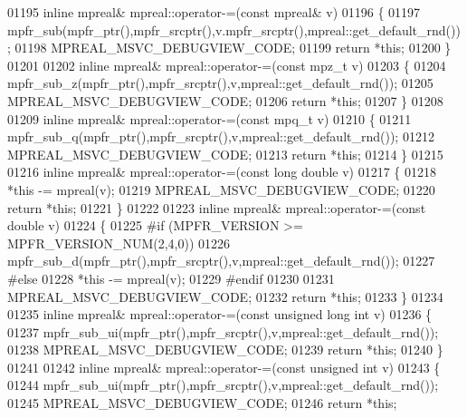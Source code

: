 \begin{DoxyCode}
01195 \textcolor{keyword}{inline} mpreal& mpreal::operator-=(\textcolor{keyword}{const} mpreal& v)
01196 \{
01197     mpfr\_sub(mpfr\_ptr(),mpfr\_srcptr(),v.mpfr\_srcptr(),mpreal::get\_default\_rnd());
01198     MPREAL\_MSVC\_DEBUGVIEW\_CODE;
01199     \textcolor{keywordflow}{return} *\textcolor{keyword}{this};
01200 \}
01201 
01202 \textcolor{keyword}{inline} mpreal& mpreal::operator-=(\textcolor{keyword}{const} mpz\_t v)
01203 \{
01204     mpfr\_sub\_z(mpfr\_ptr(),mpfr\_srcptr(),v,mpreal::get\_default\_rnd());
01205     MPREAL\_MSVC\_DEBUGVIEW\_CODE;
01206     \textcolor{keywordflow}{return} *\textcolor{keyword}{this};
01207 \}
01208 
01209 \textcolor{keyword}{inline} mpreal& mpreal::operator-=(\textcolor{keyword}{const} mpq\_t v)
01210 \{
01211     mpfr\_sub\_q(mpfr\_ptr(),mpfr\_srcptr(),v,mpreal::get\_default\_rnd());
01212     MPREAL\_MSVC\_DEBUGVIEW\_CODE;
01213     \textcolor{keywordflow}{return} *\textcolor{keyword}{this};
01214 \}
01215 
01216 \textcolor{keyword}{inline} mpreal& mpreal::operator-=(\textcolor{keyword}{const} \textcolor{keywordtype}{long} \textcolor{keywordtype}{double} v)
01217 \{
01218     *\textcolor{keyword}{this} -= mpreal(v);
01219     MPREAL\_MSVC\_DEBUGVIEW\_CODE;
01220     \textcolor{keywordflow}{return} *\textcolor{keyword}{this};
01221 \}
01222 
01223 \textcolor{keyword}{inline} mpreal& mpreal::operator-=(\textcolor{keyword}{const} \textcolor{keywordtype}{double} v)
01224 \{
01225 \textcolor{preprocessor}{#if (MPFR\_VERSION >= MPFR\_VERSION\_NUM(2,4,0))}
01226     mpfr\_sub\_d(mpfr\_ptr(),mpfr\_srcptr(),v,mpreal::get\_default\_rnd());
01227 \textcolor{preprocessor}{#else}
01228     *\textcolor{keyword}{this} -= mpreal(v);
01229 \textcolor{preprocessor}{#endif}
01230 
01231     MPREAL\_MSVC\_DEBUGVIEW\_CODE;
01232     \textcolor{keywordflow}{return} *\textcolor{keyword}{this};
01233 \}
01234 
01235 \textcolor{keyword}{inline} mpreal& mpreal::operator-=(\textcolor{keyword}{const} \textcolor{keywordtype}{unsigned} \textcolor{keywordtype}{long} \textcolor{keywordtype}{int} v)
01236 \{
01237     mpfr\_sub\_ui(mpfr\_ptr(),mpfr\_srcptr(),v,mpreal::get\_default\_rnd());
01238     MPREAL\_MSVC\_DEBUGVIEW\_CODE;
01239     \textcolor{keywordflow}{return} *\textcolor{keyword}{this};
01240 \}
01241 
01242 \textcolor{keyword}{inline} mpreal& mpreal::operator-=(\textcolor{keyword}{const} \textcolor{keywordtype}{unsigned} \textcolor{keywordtype}{int} v)
01243 \{
01244     mpfr\_sub\_ui(mpfr\_ptr(),mpfr\_srcptr(),v,mpreal::get\_default\_rnd());
01245     MPREAL\_MSVC\_DEBUGVIEW\_CODE;
01246     \textcolor{keywordflow}{return} *\textcolor{keyword}{this};

\end{DoxyCode}
